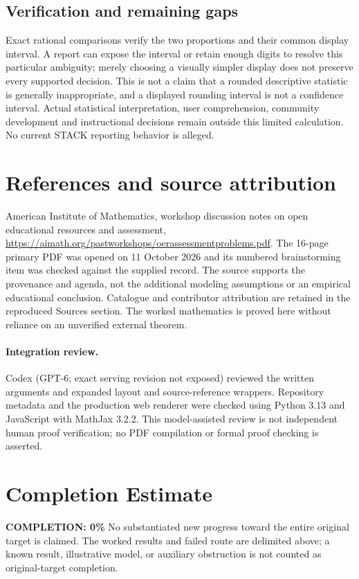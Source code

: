 \documentclass[11pt]{article}
\begin{document}
\subsection{Verification and remaining gaps}
Exact rational comparisons verify the two proportions and their common display interval. A report can expose the interval or retain enough digits to resolve this particular ambiguity; merely choosing a visually simpler display does not preserve every supported decision. This is not a claim that a rounded descriptive statistic is generally inappropriate, and a displayed rounding interval is not a confidence interval. Actual statistical interpretation, user comprehension, community development and instructional decisions remain outside this limited calculation. No current STACK reporting behavior is alleged.

\section{References and source attribution}
American Institute of Mathematics, workshop discussion notes on open educational resources and assessment, \url{https://aimath.org/pastworkshops/oerassessmentproblems.pdf}. The 16-page primary PDF was opened on 11 October 2026 and its numbered brainstorming item was checked against the supplied record. The source supports the provenance and agenda, not the additional modeling assumptions or an empirical educational conclusion. Catalogue and contributor attribution are retained in the reproduced Sources section. The worked mathematics is proved here without reliance on an unverified external theorem.


\paragraph{Integration review.} Codex (GPT-6; exact serving revision not exposed) reviewed the written arguments and expanded layout and source-reference wrappers. Repository metadata and the production web renderer were checked using Python 3.13 and JavaScript with MathJax 3.2.2. This model-assisted review is not independent human proof verification; no PDF compilation or formal proof checking is asserted.

\section{Completion Estimate}
\noindent\textbf{COMPLETION: 0\%}
No substantiated new progress toward the entire original target is claimed. The worked results and failed route are delimited above; a known result, illustrative model, or auxiliary obstruction is not counted as original-target completion.
\end{document}
